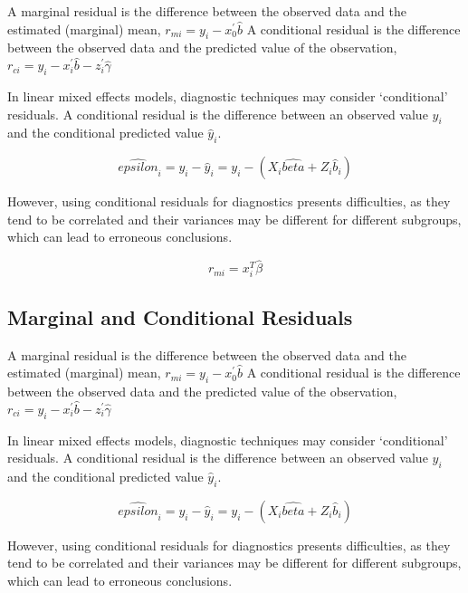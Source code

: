 \documentclass[Main.tex]{subfiles}
\begin{document}
	A marginal residual is the difference between the observed data and the estimated (marginal) mean, $r_{mi} = y_i - x_0^{\prime} \hat{b}$
	A conditional residual is the difference between the observed data and the predicted value of the observation,
	$r_{ci} = y_i - x_i^{\prime} \hat{b} - z_i^{\prime} \hat{\gamma}$
	
	In linear mixed effects models, diagnostic techniques may consider `conditional' residuals. A conditional residual is the difference between an observed value $y_{i}$ and the conditional predicted value $\hat{y}_{i} $.
	
	\[ \hat{epsilon}_{i} = y_{i} - \hat{y}_{i} = y_{i} - ( X_{i}\hat{beta} + Z_{i}\hat{b}_{i}) \]
	
	However, using conditional residuals for diagnostics presents difficulties, as they tend to be correlated and their variances may be different for different subgroups, which can lead to erroneous conclusions.
	
	
	
	
	
	
	
	\begin{equation}
	r_{mi}=x^{T}_{i}\hat{\beta}
	\end{equation}
	
	
	\subsection{Marginal and Conditional Residuals}
	
	
	A marginal residual is the difference between the observed data and the estimated (marginal) mean, $r_{mi} = y_i - x_0^{\prime} \hat{b}$
	A conditional residual is the difference between the observed data and the predicted value of the observation,
	$r_{ci} = y_i - x_i^{\prime} \hat{b} - z_i^{\prime} \hat{\gamma}$
	
	
	In linear mixed effects models, diagnostic techniques may consider `conditional' residuals. A conditional residual is the difference between an observed value $y_{i}$ and the conditional predicted value $\hat{y}_{i} $.
	
	
	\[ \hat{epsilon}_{i} = y_{i} - \hat{y}_{i} = y_{i} - ( X_{i}\hat{beta} + Z_{i}\hat{b}_{i}) \]
	
	
	However, using conditional residuals for diagnostics presents difficulties, as they tend to be correlated and their variances may be different for different subgroups, which can lead to erroneous conclusions.
	
	
	
\end{document}
